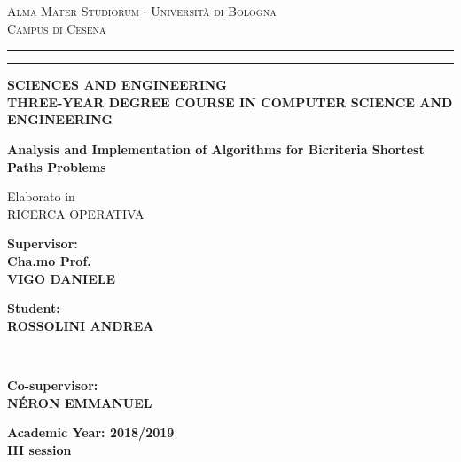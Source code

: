\documentclass[a4paper,11pt]{report}
\begin{document}
	
	\begin{titlepage}
		\begin{center}
			{{\large{\textsc{Alma Mater Studiorum $\cdot$ Universit\`a di
							Bologna\\Campus di Cesena}}}} \rule[0.2cm]{15.8cm}{0.2mm}
			\rule[0.5cm]{15.8cm}{0.6mm}
			{\small 			{{\bf SCIENCES AND ENGINEERING\\
						THREE-YEAR DEGREE COURSE IN COMPUTER SCIENCE AND ENGINEERING
			}}}
		\end{center}
		\vspace{5mm}
		\begin{center}
			{\LARGE{\bf Analysis and Implementation of Algorithms for Bicriteria Shortest Paths Problems}}\\
			\vspace{3mm}
		\end{center}
		\vspace{3mm}
		\begin{center}
			\large{Elaborato in\\
				RICERCA OPERATIVA}
		\end{center}
		\vspace{30mm}
		\par
		\noindent
		\begin{minipage}[t]{0.47\textwidth}
			{\large{\bf Supervisor:\\Cha.mo Prof.\\
					VIGO DANIELE}}
		\end{minipage}
		\vspace{5mm}
		\begin{minipage}[t]{0.47\textwidth}\raggedleft
			{\large{\bf Student:\\
					ROSSOLINI ANDREA}}
		\end{minipage}\\
		\begin{minipage}[t]{1.5\textwidth}\raggedright
			{\large{\bf Co-supervisor:\\
					N\'ERON EMMANUEL}}
		\end{minipage}
		\hfill
		\vspace{20mm}
		\begin{center}
			{\large{\bf Academic Year: 2018/2019\\III session}}%
		\end{center}
	\end{titlepage}
\end{document}
